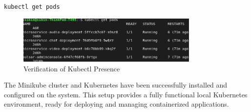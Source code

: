 \begin{lstlisting}[breaklines=true,basicstyle=\small\ttfamily,frame=single]
kubectl get pods
\end{lstlisting}

\begin{figure}[h!]
    \centering
    \includegraphics[width=0.8\textwidth]{implementation/pods.png}
    \caption{Verification of Kubectl Presence}
    \label{fig:kgetpods}
\end{figure}

The Minikube cluster and Kubernetes have been successfully installed and configured on the system. This setup provides a fully functional local Kubernetes environment, ready for deploying and managing containerized applications.







